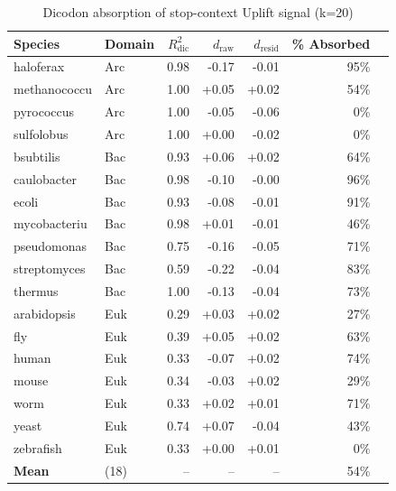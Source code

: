 
\begin{table}[htbp]
\centering
\caption{Dicodon absorption of stop-context Uplift signal (k=20)}
\label{tab:dicodon_absorption}
\begin{tabular}{llrrrrr}
\toprule
Species & Domain & $R^2_{\mathrm{dic}}$ & $d_{\mathrm{raw}}$ & $d_{\mathrm{resid}}$ & \% Absorbed \\
\midrule
haloferax & Arc & 0.98 & -0.17 & -0.01 & 95\% \\
methanococcu & Arc & 1.00 & +0.05 & +0.02 & 54\% \\
pyrococcus & Arc & 1.00 & -0.05 & -0.06 & 0\% \\
sulfolobus & Arc & 1.00 & +0.00 & -0.02 & 0\% \\
bsubtilis & Bac & 0.93 & +0.06 & +0.02 & 64\% \\
caulobacter & Bac & 0.98 & -0.10 & -0.00 & 96\% \\
ecoli & Bac & 0.93 & -0.08 & -0.01 & 91\% \\
mycobacteriu & Bac & 0.98 & +0.01 & -0.01 & 46\% \\
pseudomonas & Bac & 0.75 & -0.16 & -0.05 & 71\% \\
streptomyces & Bac & 0.59 & -0.22 & -0.04 & 83\% \\
thermus & Bac & 1.00 & -0.13 & -0.04 & 73\% \\
arabidopsis & Euk & 0.29 & +0.03 & +0.02 & 27\% \\
fly & Euk & 0.39 & +0.05 & +0.02 & 63\% \\
human & Euk & 0.33 & -0.07 & +0.02 & 74\% \\
mouse & Euk & 0.34 & -0.03 & +0.02 & 29\% \\
worm & Euk & 0.33 & +0.02 & +0.01 & 71\% \\
yeast & Euk & 0.74 & +0.07 & -0.04 & 43\% \\
zebrafish & Euk & 0.33 & +0.00 & +0.01 & 0\% \\
\midrule
\textbf{Mean} & (18) & -- & -- & -- & 54\% \\
\bottomrule
\end{tabular}
\end{table}